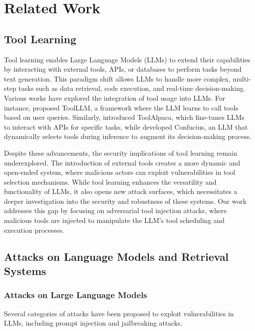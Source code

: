 

\appendix
\section{Related Work}
\label{A-related-work}
\subsection{Tool Learning}
Tool learning enables Large Language Models (LLMs) to extend their capabilities by interacting with external tools, APIs, or databases to perform tasks beyond text generation. This paradigm shift allows LLMs to handle more complex, multi-step tasks such as data retrieval, code execution, and real-time decision-making. Various works have explored the integration of tool usage into LLMs. For instance, \cite{qin2023toolllm} proposed ToolLLM, a framework where the LLM learns to call tools based on user queries. Similarly, \cite{tang2023toolalpaca} introduced ToolAlpaca, which fine-tunes LLMs to interact with APIs for specific tasks, while \cite{gao2024confucius} developed Confucius, an LLM that dynamically selects tools during inference to augment its decision-making process.

Despite these advancements, the security implications of tool learning remain underexplored. The introduction of external tools creates a more dynamic and open-ended system, where malicious actors can exploit vulnerabilities in tool selection mechanisms. While tool learning enhances the versatility and functionality of LLMs, it also opens new attack surfaces, which necessitates a deeper investigation into the security and robustness of these systems. Our work addresses this gap by focusing on adversarial tool injection attacks, where malicious tools are injected to manipulate the LLM's tool scheduling and execution processes.

\subsection{Attacks on Language Models and Retrieval Systems}

\subsubsection{Attacks on Large Language Models}

Several categories of attacks have been proposed to exploit vulnerabilities in LLMs, including prompt injection and jailbreaking attacks.

